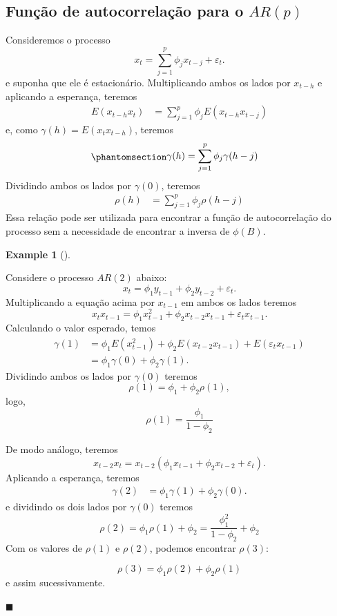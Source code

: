 \documentclass[
  letterpaper,
  DIV=11,
  numbers=noendperiod]{scrartcl}
\theoremstyle{definition}
\newtheorem{example}{Example}[chapter]
\theoremstyle{definition}
\theoremstyle{plain}
\theoremstyle{plain}
\theoremstyle{remark}
\begin{document}
\subsection{\texorpdfstring{Função de autocorrelação para o
\(AR(p)\)}{Função de autocorrelação para o AR(p)}}\label{funuxe7uxe3o-de-autocorrelauxe7uxe3o-para-o-arp}

Consideremos o processo
\[x_t = \sum_{j=1}^p\phi_j x_{t-j}+\varepsilon_t.\] e suponha que ele é
estacionário. Multiplicando ambos os lados por \(x_{t-h}\) e aplicando a
esperança, teremos \begin{align}
E(x_{t-h}x_t)&=\sum_{j=1}^p \phi_j E(x_{t-h}x_{
t-j})
\end{align} e, como \(\gamma(h)=E(x_t x_{t-h})\), teremos
\begin{equation}\protect\phantomsection\label{eq-ACF-ARP}{\begin{align}
\gamma(h)&=\sum_{j=1}^p \phi_j \gamma(h-j)
\end{align}}\end{equation} Dividindo ambos os lados por \(\gamma(0)\),
teremos \begin{align}
\rho(h)&=\sum_{j=1}^p \phi_j \rho(h-j)
\end{align} Essa relação pode ser utilizada para encontrar a função de
autocorrelação do processo sem a necessidade de encontrar a inversa de
\(\phi(B)\).

\begin{example}[]\protect\hypertarget{exm-}{}\label{exm-}

Considere o processo \(AR(2)\) abaixo:
\[x_{t}=\phi_1y_{t-1}+\phi_2y_{t-2}+\varepsilon_t.\] Multiplicando a
equação acima por \(x_{t-1}\) em ambos os lados teremos
\[x_{t}x_{t-1}=\phi_1x_{t-1}^2+\phi_2x_{t-2}x_{t-1}+\varepsilon_t x_{t-1}.\]
Calculando o valor esperado, temos \begin{align*}
    \gamma(1)&=\phi_1E(x_{t-1}^2)+\phi_2E(x_{t-2}x_{t-1})+E(\varepsilon_t x_{t-1})\\
    &=\phi_1\gamma(0) + \phi_2\gamma(1).
    \end{align*} Dividindo ambos os lados por \(\gamma(0)\) teremos
\[\rho(1)=\phi_1+\phi_2\rho(1),\] logo,
\[\rho(1)=\frac{\phi_1}{1-\phi_2}
\]

De modo análogo, teremos
\[x_{t-2} x_{t}=x_{t-2}\left(\phi_1x_{t-1}+\phi_2x_{t-2}+\varepsilon_{t}\right).\]
Aplicando a esperança, teremos \begin{align*}
    \gamma(2)&=\phi_1 \gamma(1)+\phi_2\gamma(0).
    \end{align*} e dividindo os dois lados por \(\gamma(0)\) teremos\\
\[\rho(2)=\phi_1\rho(1)+\phi_2=\frac{\phi_1^2}{1-\phi_2}+\phi_2\] Com os
valores de \(\rho(1)\) e \(\rho(2)\), podemos encontrar \(\rho(3)\):

\[\rho(3)=\phi_1\rho(2)+\phi_2\rho(1)\] e assim sucessivamente.

\(\blacksquare\)

\end{example}
\end{document}
